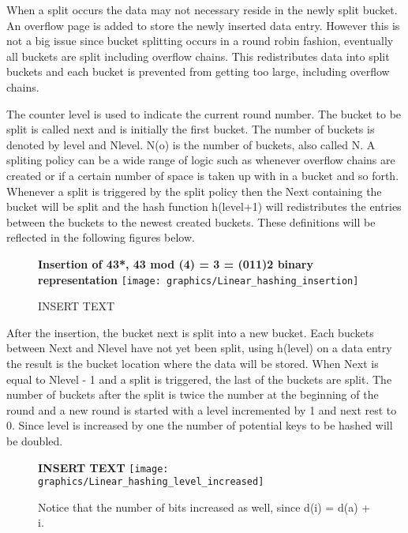 \documentclass[letterpaper, 12pt]{article}
\begin{document}
When a split occurs the data may not necessary reside in the newly split bucket. An overflow page is 
added to store the newly inserted data entry. However this is not a big issue since bucket splitting 
occurs in a round robin fashion, eventually all buckets are split including overflow chains. 
This redistributes data into split buckets and each bucket is prevented from getting too large, 
including overflow chains.
\par\vspace{\baselineskip}
The counter level is used to indicate the current round number. The bucket to be split is called 
next and is initially the first bucket. The number of buckets is denoted by level and Nlevel. 
N(o) is the number of buckets, also called N. A spliting policy can be a wide range of logic 
such as whenever overflow chains are created or if a certain number of space is taken up with 
in a bucket and so forth. Whenever a split is triggered by the split policy then the Next containing 
the bucket will be split and the hash function h(level+1) will redistributes the entries 
between the buckets to the newest created buckets. These definitions will be reflected in the 
following figures below.

\begin{figure}
  \centering
  \textbf{Insertion of 43*, 43 mod (4) = 3 = (011)2 binary representation}
  \texttt{[image: graphics/Linear\_hashing\_insertion]}
  \caption{INSERT TEXT}
\end{figure}

\par\vspace{\baselineskip}
After the insertion, the bucket next is split into a new bucket. Each buckets between Next and Nlevel have not yet been split,
using h(level) on a data entry the result is the bucket location where the data will be stored. 
When Next is equal to Nlevel - 1 and a split is triggered, the last of the buckets are split. The number of buckets after the split is twice the number at the beginning
of the round and a new round is started with a level incremented by 1 and next rest to 0. Since level is increased by one the number of potential keys to be hashed will
be doubled. 
\begin{figure}
  \centering
  \textbf{INSERT TEXT}
  \texttt{[image: graphics/Linear\_hashing\_level\_increased]}
  \caption{Notice that the number of bits increased as well, since d(i) = d(a) + i.}
\end{figure}
\end{document}
